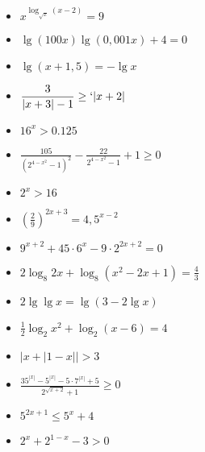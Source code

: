 \documentclass{article}
\begin{document}

\begin{itemize}
\item $\displaystyle x^{\log_{\sqrt{x}}(x-2)}=9$
\item $\displaystyle \lg(100x)\lg(0,001x)+4=0$
\item $\displaystyle \lg (x+1,5)=-\lg x$
\end{itemize}

\begin{itemize}
\item $\displaystyle \frac{3}{|x+3|-1} \geq `|x+2|$
\end{itemize}

\begin{itemize}
\item $\displaystyle16^x >0.125$
\item $\displaystyle \frac{105}{\left( 2^{4-x^2} -1\right)^2}-\frac{22}{2^{4-x^2}-1}+1\geq0$
\item $\displaystyle 2^x>16$
\end{itemize}

\begin{itemize}
\item $\displaystyle \left(\frac{2}{9}\right)^{2x+3}=4,5^{x-2}$
\item $\displaystyle 9^{x+2}+45\cdot6^x-9\cdot2^{2x+2}=0$
\end{itemize}



\begin{itemize}
\item $\displaystyle 2\log_{8}2x+\log_{8}(x^2-2x+1)=\frac{4}{3}$
\item $\displaystyle 2\lg \lg x=\lg (3-2\lg x)$
\item $\displaystyle \frac{1}{2}\log_{2}x^2+\log_{2}(x-6)=4$
\end{itemize}

\begin{itemize}
\item $\displaystyle|x + |1 - x||> 3$
\end{itemize}

\begin{itemize}
\item $\displaystyle \frac{35^{|x|}-5^{|x|}-5\cdot7^{|x|}+5}{2^{\sqrt{x+2}}+1}\geq0$
\item $\displaystyle 5^{2x+1}\leq5^x+4$
\item $\displaystyle 2^x+2^{1-x}-3>0$
\end{itemize}
\end{document}
